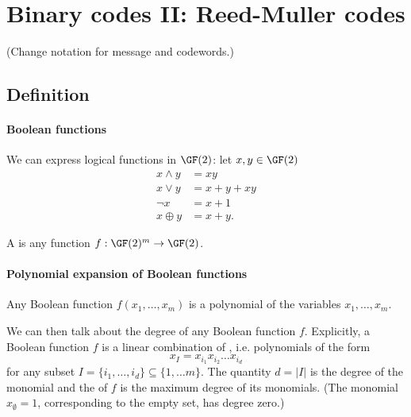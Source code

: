 \documentclass[a4paper, 11pt, openany]{book}
\begin{document}
\section{Binary codes II: Reed-Muller codes}
\label{sec:25}


(Change notation for message and codewords.)


\subsection{Definition}

\paragraph{Boolean functions}
We can express logical functions in $\GF(2)$: let $x,y \in \GF(2)$
\begin{align*}
	x \land y &= xy\\
	x \lor y &= x + y + xy\\
	\neg x &= x + 1\\
	x \oplus y &= x + y.
\end{align*}

A  is any function $f : \GF(2)^m \to \GF(2)$.


\paragraph{Polynomial expansion of Boolean functions}
\begin{theorem}
Any Boolean function $f(x_1, \dots, x_m)$ is a polynomial of the variables $x_1, \dots, x_m$.
\end{theorem}


%
We can then talk about the degree of any Boolean function $f$. Explicitly, a Boolean function $f$ is a linear combination of , i.e. polynomials of the form
\[
    x_I = x_{i_1} x_{i_2} \dots x_{i_d}
\]
for any subset $I = \{i_1, \dots, i_d\} \subseteq \{1, \dots m\}$. The quantity $d = |I|$ is the degree of the monomial and the  of $f$ is the maximum degree of its monomials. (The monomial $x_\emptyset = 1$, corresponding to the empty set, has degree zero.)
\end{document}
